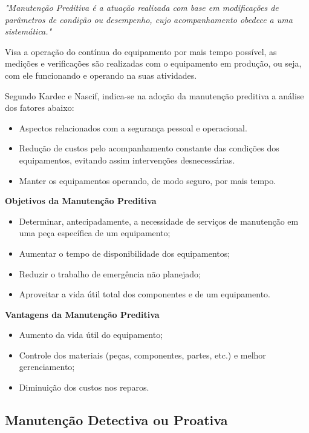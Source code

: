 		\emph{"Manutenção Preditiva é a atuação realizada com base em modificações de parâmetros de condição ou desempenho, cujo acompanhamento obedece a uma sistemática."} \cite{kardecnascif2010}

		Visa a operação do contínua do equipamento por mais tempo possível, as medições e verificações são realizadas com o equipamento em produção, ou seja, com ele funcionando e operando na suas atividades. 

		Segundo Kardec e Nascif, indica-se na adoção da manutenção preditiva a análise dos fatores abaixo:

			\begin{itemize}
				\item Aspectos relacionados com a segurança pessoal e operacional.
				\item Redução de custos pelo acompanhamento constante das condições dos equipamentos, evitando assim intervenções desnecessárias.
				\item Manter os equipamentos operando, de modo seguro, por mais tempo.
			\end{itemize}

		\textbf{Objetivos da Manutenção Preditiva}

			\begin{itemize}
				\item Determinar, antecipadamente, a necessidade de serviços de manutenção em uma peça específica  de um equipamento;  
				\item Aumentar o tempo de disponibilidade dos equipamentos;
				\item Reduzir o trabalho de emergência não planejado;  
				\item Aproveitar a vida útil total dos componentes e de um equipamento.
			\end{itemize}

		\textbf{Vantagens da Manutenção Preditiva}

			\begin{itemize}
				\item Aumento da vida útil do equipamento; 
				\item Controle dos materiais (peças, componentes, partes, etc.) e melhor gerenciamento; 
				\item Diminuição dos custos nos reparos.
			\end{itemize}
		

\subsection{Manutenção Detectiva ou Proativa}

